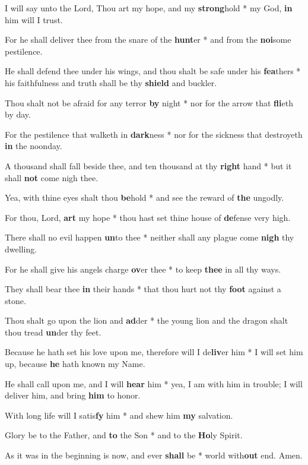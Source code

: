 \begin{multicols}{2}
	I will say unto the Lord, Thou art my hope, and my \textbf{strong}hold * my God, \textbf{in} him will I trust.
	
	For he shall deliver thee from the snare of the \textbf{hunt}er * and from the \textbf{noi}some pestilence.
	
	He shall defend thee under his wings, and thou shalt be safe under his \textbf{fea}thers * his faithfulness and truth shall be thy \textbf{shield} and buckler.
	
	Thou shalt not be afraid for any terror \textbf{by} night * nor for the arrow that \textbf{fli}eth by day.
	
	For the pestilence that walketh in \textbf{dark}ness * nor for the sickness that destroyeth \textbf{in} the noonday.
	
	A thousand shall fall beside thee, and ten thousand at thy \textbf{right} hand * but it shall \textbf{not} come nigh thee.
	
	Yea, with thine eyes shalt thou \textbf{be}hold * and see the reward of \textbf{the} ungodly.
	
	For thou, Lord, \textbf{art} my hope * thou hast set thine house of \textbf{de}fense very high.
	
	There shall no evil happen \textbf{un}to thee * neither shall any plague come \textbf{nigh} thy dwelling.
	
	For he shall give his angels charge \textbf{ov}er thee * to keep \textbf{thee} in all thy ways.
	
	They shall bear thee \textbf{in} their hands * that thou hurt not thy \textbf{foot} against a stone.
	
	Thou shalt go upon the lion and \textbf{ad}der * the young lion and the dragon shalt thou tread \textbf{un}der thy feet.
	
	Because he hath set his love upon me, therefore will I de\textbf{liv}er him * I will set him up, because \textbf{he} hath known my Name.
	
	He shall call upon me, and I will \textbf{hear} him * yea, I am with him in trouble; I will deliver him, and bring \textbf{him} to honor.
	
	With long life will I satis\textbf{fy} him * and shew him \textbf{my} salvation.
	
	Glory be to the Father, and \textbf{to} the Son * and to the \textbf{Ho}ly Spirit.
	
	As it was in the beginning is now, and ever \textbf{shall} be * world with\textbf{out} end. Amen.
\end{multicols}